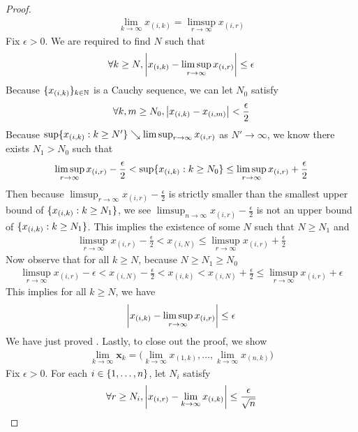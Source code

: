 \documentclass{report}
\begin{document}
\begin{proof}
\begin{align}
\label{ran2}
\lim_{k\to \infty}x_{(i,k)}= \limsup_{r\to\infty} x_{(i,r)}
\end{align}
Fix $\epsilon >0$. We are required to find $N$ such that
\begin{align*}
\forall k\geq N, \left|x_{(i,k)}-\limsup_{r\to\infty}x_{(i,r)}\right| \leq \epsilon 
\end{align*}
Because $\{ x_{(i,k)} \}_{k\in\mathbb{N}}$ is a Cauchy sequence, we can let $N_0$ satisfy 
\begin{align*}
\forall k,m\geq N_0, \left|x_{(i,k)}-x_{(i,m)}\right|<\frac{\epsilon}{2}
\end{align*}
Because $\sup \{ x_{(i,k)}:k\geq N' \}\searrow \limsup_{r\to\infty} x_{(i,r)}$ as $N'\to \infty$, we know there exists $N_1>N_0$ such that 
 \begin{align*}
\limsup_{r\to\infty} x_{(i,r)}-\frac{\epsilon}{2} <\sup \{ x_{(i,k)}:k\geq N_0 \}\leq \limsup_{r\to\infty}  x_{(i,r)} + \frac{\epsilon}{2} 
\end{align*}
Then because $\limsup_{r\to\infty} x_{(i,r)}-\frac{\epsilon}{2}$ is strictly smaller than the smallest upper bound of $\{ x_{(i,k)}:k\geq N_1 \}$, we see $\limsup_{n\to\infty} x_{(i,r)}-\frac{\epsilon}{2}$ is not an upper bound of $\{ x_{(i,k)}:k\geq N_1 \}$. This implies the existence of some $N$ such that  $N\geq N_1$ and
\begin{align*}
\limsup_{r\to\infty} x_{(i,r)}-\frac{\epsilon}{2}< x_{(i,N)}\leq \limsup_{r\to\infty}x_{(i,r)} + \frac{\epsilon}{2}
\end{align*}
Now observe that for all $k\geq N$, because $N\geq N_1\geq N_0$ 
\begin{align*}
  \limsup_{r\to\infty} x_{(i,r)} - \epsilon <x_{(i,N)}-\frac{\epsilon}{2}<x_{(i,k)}< x_{(i,N)}+\frac{\epsilon}{2} \leq \limsup_{r\to\infty} x_{(i,r)} + \epsilon   
\end{align*}
This implies for all $k\geq N$, we have 
\begin{align*}
\left|x_{(i,k)}-\limsup_{r\to\infty} x_{(i,r)}\right|\leq \epsilon 
\end{align*}
We have just proved . Lastly, to close out the proof, we show 
\begin{align}
\label{ran3}
\lim_{k\to \infty}\textbf{x}_k = \Big(\lim_{k\to \infty}x_{(1,k)},\dots ,\lim_{k\to \infty}x_{(n,k)}\Big)
\end{align}
Fix $\epsilon >0$. For each $i \in \{ 1,\dots ,n \}$, let $N_i$ satisfy 
 \begin{align*}
  \forall r\geq N_i ,\abso{x_{(i,r)}- \lim_{k\to \infty}x_{(i,k)}}\leq  \frac{\epsilon }{\sqrt{n} }

\end{align*}
\end{proof}
\end{document}
